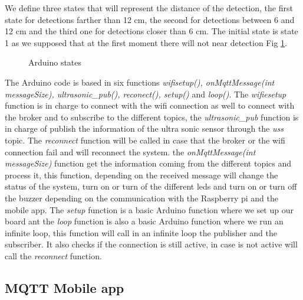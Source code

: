 \documentclass[12pt]{article}
\begin{document}
We define three states that will represent the distance of the detection, the first state for detections farther than 12 cm, the second for detections between 6 and 12 cm and the third one for detections closer than 6 cm. The initial state is state 1 as we supposed that at the first moment there will not near detection Fig \ref{fig:arduino2}.

\begin{figure}[h]
\caption{Arduino states}
\label{fig:arduino2}
\end{figure}

The Arduino code is based in six functions \textit{wifisetup(), onMqttMessage(int messageSize), ultrasonic\_pub(), reconect(), setup()} and \textit{loop()}. The \textit{wifiesetup} function is in charge to connect with the wifi connection as well to connect with the broker and to subscribe to the different topics, the \textit{ultrasonic\_pub}  function is in charge of publish the information of the ultra sonic sensor through the \textit{uss} topic. The \textit{reconnect} function will be called in case that the broker or the wifi connection fail and will reconnect the system. the \textit{onMqttMessage(int messageSize)} function get the information coming from the different topics and process it, this function, depending on the received message will change the status of the system, turn on or turn of the different leds and turn on or turn off the buzzer depending on the communication with the Raspberry pi and the mobile app. The \textit{setup} function is a basic Arduino function where we set up our board ant the \textit{loop} function is also a basic Arduino function where we run an infinite loop, this function will call in an infinite loop the publisher and the subscriber. It also checks if the connection is still active, in case is not active will call the \textit{reconnect} function.

\subsection{MQTT Mobile app}
\end{document}
